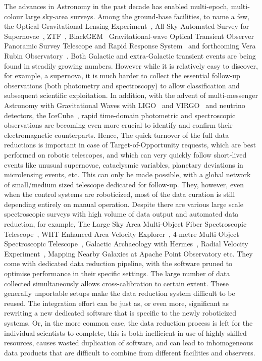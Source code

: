 \documentclass{aa}
\begin{document}
The advances in Astronomy in the past decade has enabled multi-epoch, multi-colour
large sky-area surveys. Among the ground-base facilities, to name a few, the
Optical Gravitational Lensing Experiment~\citep[OGLE]{2015AcA....65....1U},
All-Sky Automated Survey for Supernovae~\citep[ASAS-SN]{2017PASP..129j4502K},
ZTF~\citep[Zwicky Transient Facility]{2019PASP..131a8003M},
BlackGEM~\citep[BlackGEM]{2015ASPC..496..254B}
Gravitational-wave Optical Transient Observer~\citep[GOTO]{2020SPIE11445E..7GD}
Panoramic Survey Telescope and Rapid Response System~\citep[Pan-STARRS]{2016arXiv161205560C}
and forthcoming Vera Rubin Observatory~\citep[VRO]{2019ApJ...873..111I}. Both Galactic
and extra-Galactic transient events are being found in steadily growing numbers.
However while it is relatively easy to discover, for example, a supernova, it is much
harder to collect the essential follow-up observations (both photometry and spectroscopy)
to allow classification and subsequent scientific exploitation. In addition, with the
advent of multi-messenger Astronomy with Gravitational Waves with
LIGO~\citep{2015CQGra..32g4001L} and VIRGO~\citep{2015CQGra..32b4001A} and neutrino
detectors, the IceCube~\citep{2006APh....26..155I}, rapid time-domain photometric and
spectroscopic observations are becoming even more crucial to identify and confirm their
electromagnetic counterparts. Hence, The quick turnover of the full data reductions is
important in case of Target-of-Opportunity requests, which are best performed on robotic
telescopes, and which can very quickly follow short-lived events like unusual supernovae,
cataclysmic variables, planetary deviations in microlensing events, etc. This can only be
made possible, with a global network of small/medium sized telescope dedicated for
follow-up. They, however, even when the control systems are roboticized, most of the
data curation is still depending entirely on manual operation. Despite there are various
large scale spectroscopic surveys with high volume of data output and automated data
reduction, for example, The Large Sky Area Multi-Object Fiber Spectroscopic
Telescope~\citep[LAMOST]{2012RAA....12.1197C}, WHT Enhanced Area Velocity
Explorer~\citep[WEAVE]{2012SPIE.8446E..0PD}, 4-metre Multi-Object Spectroscopic
Telescope~\citep[4MOST]{2019Msngr.175....3D}, Galactic Archaeology with
Hermes~\citep[GALAH]{2015MNRAS.449.2604D}, Radial Velocity
Experiment~\citep[RAVE]{2020AJ....160...82S}, Mapping Nearby Galaxies at Apache Point
Observatory\citep[MaNGA]{2015ApJ...798....7B} etc. They come with dedicated data
reduction pipeline, with the software pruned to optimise performance in their specific
settings. The large number of data collected simultaneously allows cross-calibration
to certain extent. These generally unportable setups make the data reduction system
difficult to be reused. The integration effort can be just as, or even more, significant
as rewriting a new dedicated software that is specific to the newly roboticized systems.
Or, in the more common case, the data reduction process is left for the individual
scientists to complete, this is both inefficient in use of highly skilled resources,
causes wasted duplication of software, and can lead to inhomogeneous data products
that are difficult to combine from different facilities and observers.
\end{document}
